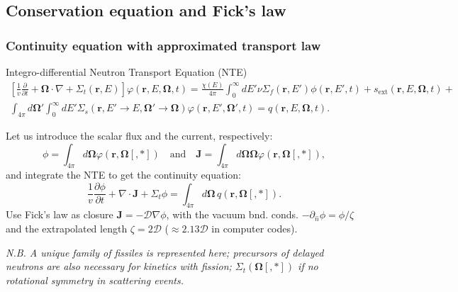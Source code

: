 \documentclass[black]{slideCEA}
\newcommand{\bOm}{\boldsymbol{\Omega}}
\begin{document}
\subsection{Conservation equation and Fick's law}
\begin{frame}
  \frametitle{Continuity equation with approximated transport law}
  \vspace{-5mm}
  \begin{block}{Integro-differential Neutron Transport Equation (NTE)}
  {\hfill \normalsize \cite{duderstadt1979transport}}
  {
  \begin{gather*}
  \left[ \frac{1}{v}\frac{\partial}{\partial t}
  + \bOm \cdot \nabla + \Sigma_t(\mathbf{r}, E) \right] \varphi(\mathbf{r}, E, \bOm, t)
  = \frac{\chi(E)}{4\pi} \int_0^{\infty} {dE' \nu\Sigma_f(\mathbf{r}, E') \phi(\mathbf{r}, E', t)}
  + s_{\text{ext}}(\mathbf{r}, E, \bOm, t) +\\
  \int_{4\pi} d\bOm'
  \int_0^{\infty} {dE' \Sigma_s(\mathbf{r}, E' \rightarrow E, \bOm' \rightarrow \bOm)
  \varphi(\mathbf{r}, E', \bOm', t)
  } = q(\mathbf{r}, E, \bOm, t).
  \end{gather*}
  }
  \end{block}
  Let us introduce the scalar flux and the current, respectively:
  \[
    \phi = \int_{4\pi}{d \boldsymbol{\Omega}
    \varphi(\mathbf{r}, \boldsymbol{\Omega}[, \ast] )}
    \quad \text{and} \quad
    \mathbf{J} = \int_{4\pi}{d \boldsymbol{\Omega} \boldsymbol{\Omega}
    \varphi(\mathbf{r}, \boldsymbol{\Omega}[, \ast] )},
  \]
  and integrate the NTE to get the continuity equation:
  \[
    \frac{1}{v}\frac{\partial \phi}{\partial t} + \nabla \cdot \mathbf{J}
    + \Sigma_t \phi = \int_{4\pi}{d \bOm \, q(\mathbf{r}, \boldsymbol{\Omega}[, \ast] )}.
  \]
  Use \textcolor{ceared1}{Fick's law} as closure
  \textcolor{ceared1}{$\mathbf{J} = - \mathcal{D}\nabla \phi$}, with the
  vacuum bnd. conds. $- \partial_{\hat{n}} \phi = \phi/
  \zeta$ and the extrapolated length $\zeta = 2\mathcal{D}$ ($\approx 2.13
  \mathcal{D}$ in computer codes).
  \begin{alertblock}{}
    \textit{N.B. A unique family of fissiles is represented here;
    precursors of delayed neutrons are also necessary for kinetics
    with fission; $\Sigma_t(\bOm[, \ast])$ if no rotational symmetry
    in scattering events.}
  \end{alertblock}
\end{frame}
\end{document}
